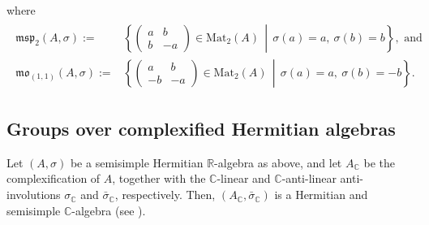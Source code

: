 \documentclass[oneside,11pt]{amsart}
\theoremstyle{definition}
\theoremstyle{remark}
\newcommand{\midwd}{\,\middle\vert\,}
\numberwithin{thm}{section}
\numberwithin{equation}{section}
\begin{document}
where
\begin{align}\label{eq1.6}
\begin{aligned}
    \mathfrak{msp}_2(A,\sigma):=&\left\{\begin{pmatrix}
    a & b\\
    b & -a
    \end{pmatrix}\in\mathrm{Mat}_2(A)\midwd \sigma(a)=a,\ \sigma(b)=b\right\}, \text{ and }\\[2pt]
    \mathfrak{mo}_{(1,1)}(A,\sigma):=&\left\{\begin{pmatrix}
    a & b\\
    -b & -a
    \end{pmatrix}\in\mathrm{Mat}_2(A)\midwd \sigma(a)=a,\ \sigma(b)=-b\right\}.
\end{aligned}
\end{align}

\subsection{Groups over complexified Hermitian algebras}\label{group_complexified_hermitian}

Let $(A,\sigma)$ be a semisimple Hermitian $\mathbb{R}$-algebra as above, and let $A_\mathbb{C}$ be the complexification of $A$, together with the $\mathbb{C}$-linear and $\mathbb{C}$-anti-linear anti-involutions $\sigma_\mathbb{C}$ and $\bar\sigma_{\mathbb{C}}$, respectively. Then,  $(A_\mathbb{C},\bar\sigma_\mathbb{C})$ is a Hermitian and semisimple $\mathbb{C}$-algebra (see \cite[Corollary 2.79]{ABRRW}). 
\end{document}
